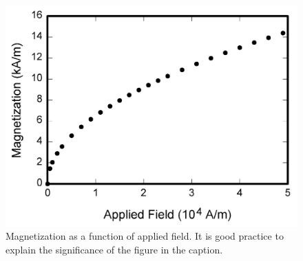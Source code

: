 \begin{figure}[!t]
\centerline{\includegraphics[width=0.7\columnwidth]{figure/image/fig1.png}}
\caption{Magnetization as a function of applied field.
It is good practice to explain the significance of the figure in the caption.}
\label{fig:fig1}
\end{figure}